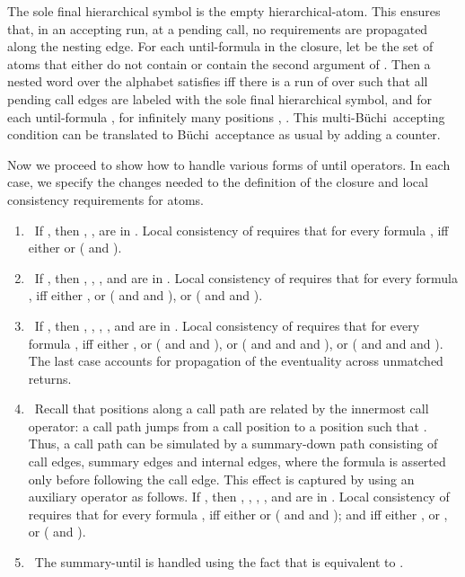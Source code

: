 \documentclass{LMCS}
\theoremstyle{plain}
\theoremstyle{definition}
\def\buchi{B\"{u}chi}
\begin{document}
The sole final  hierarchical symbol is the empty hierarchical-atom.
This ensures that, in an accepting run,
at a pending call, no requirements are propagated along the nesting edge.
For each until-formula  in the closure, let  be the set
of atoms that either do not contain  or contain the second argument of .
Then a nested word  over the alphabet  satisfies   iff
there is a run  of  over  such that 
all pending call edges are labeled with the sole final hierarchical symbol, and
for each until-formula , for infinitely many positions ,
. 
This multi-\buchi\ accepting condition  can
be translated to \buchi\ acceptance as usual by adding a counter.


Now we proceed to show how to handle various forms of until operators.
In each case, we specify the changes needed to the definition of the closure
and local consistency requirements for atoms. 
\begin{enumerate}
\item{}\
If , then , ,
 are in .
Local consistency of  requires that
for every formula ,
            iff
           either  or ( and
                      ).
\item{}\
If , then , ,
, and 
 are in .
Local consistency of  requires that
for every formula ,
            iff
           either , or 
           ( and  and ), or
( and  and ).
\item{}\
If , then , ,
, , and 
 are in .
Local consistency of  requires that
for every formula ,
            iff
           either , or 
           ( and  and ), or
( and  and  and ), 
or ( and  and  and
).
The last case accounts for propagation of the eventuality across unmatched returns.
\item{}\
Recall that positions along a call path are related by the innermost call operator:
a call path jumps from a call position  to a position  such that .
Thus, a call path can be simulated by a summary-down path consisting of
call edges, summary edges and internal edges, where the formula is asserted
only before following the call edge. This effect is captured by using an auxiliary
operator as follows.
If , then , , ,
, and 
 are in
.
Local consistency of  requires that
for every formula ,
            iff
           either  or ( and  and
  );
and 
            iff
           either , or , or
 ( and ).
\item{}\
 The summary-until is handled using the fact that
 is equivalent to
.
\end{enumerate}\smallskip
\end{document}

